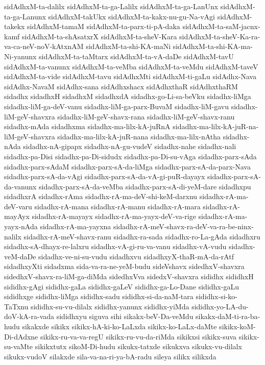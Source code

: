 {sidAdhxM-ta-dalilx
sidAdhxM-ta-ga-Lalilx
sidAdhxM-ta-ga-LanUnx
sidAdhxM-ta-ga-Lanunx
sidAdhxM-takUkx
sidAdhxM-ta-kakx-nu-gu-Na-vAgi
sidAdhxM-takekx
sidAdhxM-tamaM
sidAdhxM-ta-parx-ti-pA-daka
sidAdhxM-ta-saM-jacnx-kamf
sidAdhxM-ta-shAsatxrX
sidAdhxM-ta-sheV-Kara
sidAdhxM-ta-sheV-Ka-ra-va-ca-neV-noV-kAtxnAM
sidAdhxM-ta-shi-KA-maNi
sidAdhxM-ta-shi-KA-ma-Ni-yanunx
sidAdhxM-ta-taMtarx
sidAdhxM-ta-vA-daDe
sidAdhxM-tavU
sidAdhxM-ta-vanunx
sidAdhxM-ta-veMba
sidAdhxM-ta-veMdu
sidAdhxM-taveV
sidAdhxM-ta-vide
sidAdhxM-tavu
sidAdhxMti
sidAdhxM-ti-gaLu
sidAdhx-Nava
sidAdhx-NavaM
sidAdhx-sana
sidAdhxshacx
sidAdhxthaR
sidAdhxthaRM
sidadhx
sidadhxH
sidadhxM
sidadhxdA
sidadhx-go-Li-sa-beVku
sidadhx-liMga
sidadhx-liM-ga-deV-vanu
sidadhx-liM-ga-parx-BuvaM
sidadhx-liM-gavu
sidadhx-liM-geV-shavxra
sidadhx-liM-geV-shavx-rana
sidadhx-liM-geV-shavx-ranu
sidadhx-mAda
sidadhxma
sidadhx-ma-lilx-kA-juRnA
sidadhx-ma-lilx-kA-juR-na-liM-geV-shavxra
sidadhx-ma-lilx-kA-juR-nana
sidadhx-ma-lilx-nAtha
sidadhx-nAda
sidadhx-nA-gipapx
sidadhx-nA-gu-vudeV
sidadhx-nahe
sidadhx-nali
sidadhx-pa-Disi
sidadhx-pa-Di-sidudx
sidadhx-pa-Di-su-vAga
sidadhx-parx-sAda
sidadhx-parx-sAdaM
sidadhx-parx-sA-da-liMga
sidadhx-parx-sA-da-parx-Nava
sidadhx-parx-sA-da-vAgi
sidadhx-parx-sA-da-vA-gi-puR-dayayx
sidadhx-parx-sA-da-vanunx
sidadhx-parx-sA-da-veMba
sidadhx-parx-sA-di-yeM-dare
sidadhxpu
sidadhxrA
sidadhx-rAma
sidadhx-rA-ma-deV-shi-keM-darxnu
sidadhx-rA-ma-deV-varu
sidadhx-rA-mana
sidadhx-rA-manu
sidadhx-rA-mara
sidadhx-rA-mayAyx
sidadhx-rA-mayayx
sidadhx-rA-ma-yayx-deV-va-rige
sidadhx-rA-ma-yayx-nAda
sidadhx-rA-ma-yayxna
sidadhx-rA-meV-shavx-ra-deV-va-ra-be-ninx-nalilx
sidadhx-rA-meV-shavx-ranu
sidadhx-ra-sada
sidadhx-ro-La-gAda
sidadhxru
sidadhx-sA-dhayx-re-lalxru
sidadhx-vA-gi-ru-va-vanu
sidadhx-vA-vudu
sidadhx-veM-daDe
sidadhx-ve-ni-su-vudu
sidadhxvu
sidadhxyX-thaR-mA-da-rAtf
sidadhxyXti
sidadxma
sida-va-ra-ne-yeM-budu
sideVshavx
sidedhxV-shavxra
sidedhxV-shavx-ra-liM-ga-diMda
sidedhxVva
sidedxV-shavxra
sididhx
sididhxH
sididhx-gAgi
sididhx-gaLa
sididhx-gaLeV
sididhx-ga-Lo-Dane
sididhx-gaLu
sididhxge
sididhx-liMga
sididhx-sadu
sididhx-si-da-naM-tara
sididhx-si-ko-TaTxnu
sididhx-su-vu-dilalx
sididhx-yanunx
sididhx-yiMda
sididhx-yo-LA-du-doV-kA-ra-vada
sididhxyu
siguva
sihi
sikakx-beV-Da-veMdu
sikakx-daM-ti-ra-ba-hudu
sikakxde
sikikx
sikikx-hA-ki-ko-LaLxda
sikikx-ko-LaLx-daMte
sikikx-koM-Di-dAdxne
sikikx-ru-va-va-regU
sikikx-ru-vu-da-riMda
sikikxsi
sikikx-suva
sikikx-su-vaMte
sikikxtutx
sikoM-Di-hudu
sikukx-tatxde
sikukxva
sikukx-vu-dilalx
sikukx-vudoV
silakxde
sila-va-na-ri-ya-bA-radu
sileya
silikx
silikxda
}

